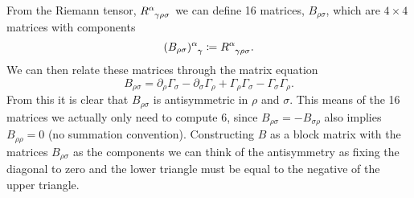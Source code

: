 \documentclass[fleqn]{NotesClass}
\begin{document}
    From the Riemann tensor, \(\tensor{R}{^\alpha_{\gamma\rho\sigma}}\) we can define 16 matrices, \(B_{\rho\sigma}\), which are \(4\times 4\) matrices with components
    \begin{equation}
        \tensor{(B_{\rho\sigma})}{^\alpha_\gamma} \coloneqq \tensor{R}{^\alpha_{\gamma\rho\sigma}}.
    \end{equation}
    We can then relate these matrices through the matrix equation
    \begin{equation}
        B_{\rho\sigma} = \partial_\rho \Gamma_\sigma - \partial_\sigma \Gamma_\rho + \Gamma_\rho \Gamma_\sigma - \Gamma_\sigma \Gamma_\rho.
    \end{equation}
    From this it is clear that \(B_{\rho\sigma}\) is antisymmetric in \(\rho\) and \(\sigma\).
    This means of the 16 matrices we actually only need to compute 6, since \(B_{\rho\sigma} = -B_{\sigma\rho}\) also implies \(B_{\rho\rho} = 0\) (no summation convention).
    Constructing \(B\) as a block matrix with the matrices \(B_{\rho\sigma}\) as the components we can think of the antisymmetry as fixing the diagonal to zero and the lower triangle must be equal to the negative of the upper triangle.
    
\end{document}
